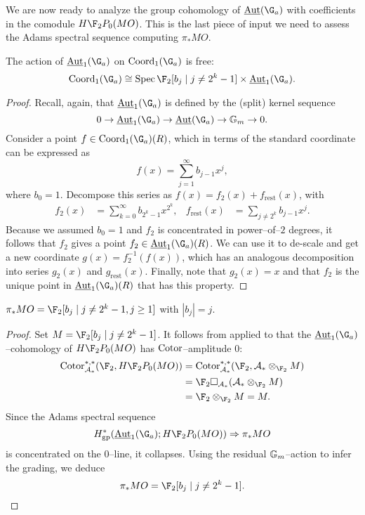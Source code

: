 We are now ready to analyze the group cohomology of $\InternalAut(\G_a)$ with coefficients in the comodule $H\F_2P_0(MO)$.  This is the last piece of input we need to assess the Adams spectral sequence computing $\pi_* MO$.
\begin{theorem}\label{CalculationOfAutGaActionOnMO}
The action of $\InternalAut_1(\G_a)$ on $\Coord_1(\G_a)$ is free: \[\Coord_1(\G_a) \cong \Spec \F_2[b_j \mid j \ne 2^k - 1] \times \InternalAut_1(\G_a).\]
\end{theorem}
\begin{proof}
Recall, again, that $\InternalAut_1(\G_a)$ is defined by the (split) kernel sequence \[0 \to \InternalAut_1(\G_a) \to \InternalAut(\G_a) \to \Gm \to 0.\]  Consider a point $f \in \Coord_1(\G_a)(R)$, which in terms of the standard coordinate can be expressed as \[f(x) = \sum_{j=1}^\infty b_{j-1} x^j,\] where $b_0 = 1$.  Decompose this series as $f(x) = f_2(x) + f_{\mathrm{rest}}(x)$, with
\begin{align*}
f_2(x) & = \sum_{k=0}^\infty b_{2^k-1} x^{2^k}, &
f_{\mathrm{rest}}(x) & = \sum_{j \ne 2^k} b_{j-1} x^j.
\end{align*}
Because we assumed $b_0 = 1$ and $f_2$ is concentrated in power--of--$2$ degrees, it follows that $f_2$ gives a point $f_2 \in \InternalAut_1(\G_a)(R)$.  We can use it to de-scale and get a new coordinate $g(x) = f_2^{-1}(f(x))$, which has an analogous decomposition into series $g_2(x)$ and $g_{\mathrm{rest}}(x)$.  Finally, note that $g_2(x) = x$ and that $f_2$ is the unique point in $\InternalAut_1(\G_a)(R)$ that has this property.
\end{proof}

\begin{corollary}
$\pi_* MO = \F_2[b_j \mid j \ne 2^k - 1, j \ge 1]$ with $|b_j| = j$.
\end{corollary}
\begin{proof}
Set $M = \F_2[b_j \mid j \ne 2^k - 1]$.  It follows from  applied to  that the $\InternalAut_1(\G_a)$--cohomology of $H\F_2P_0(MO)$ has $\operatorname{Cotor}$--amplitude $0$:
\begin{align*}
\Cotor_{\mathcal A_*}^{*, *}(\F_2, H\F_2P_0(MO)) & = \Cotor_{\mathcal A_*}^{*, *}(\F_2, \mathcal A_* \otimes_{\F_2} M) \\
& = \F_2 \cotensor_{\mathcal A_*} (\mathcal A_* \otimes_{\F_2} M) \\
& = \F_2 \otimes_{\F_2} M = M.
\end{align*}
Since the Adams spectral sequence \[H^*_{\mathrm{gp}}(\InternalAut_1(\G_a); H\F_2P_0(MO)) \Rightarrow \pi_* MO\] is concentrated on the $0$--line, it collapses.  Using the residual $\mathbb G_m$--action to infer the grading, we deduce \[\pi_* MO = \F_2[b_j \mid j \ne 2^k-1]. \qedhere\]
\end{proof}

